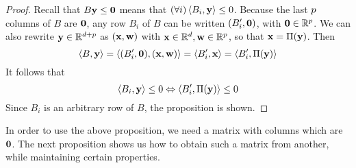 \begin{proof}
	Recall that $B\mathbf{y} \leq \mathbf{0}$ means that $(\forall i)\left\langle B_i, \mathbf{y} \right\rangle \leq 0$.  Because the last $p$ columns of $B$ are $\mathbf{0}$, any row $B_i$ of $B$ can be written $(B'_i,\mathbf{0})$, with $\mathbf{0} \in \mathbb{R}^p$.  We can also rewrite $\mathbf{y}\in\mathbb{R}^{d+p}$ as $(\mathbf{x},\mathbf{w})$ with $\mathbf{x}\in\mathbb{R}^d,\mathbf{w}\in\mathbb{R}^p$, so that $\mathbf{x} = \Pi(\mathbf{y})$.  Then
	\[ \left\langle B, \mathbf{y} \right\rangle = \left\langle (B'_i,\mathbf{0}), (\mathbf{x},\mathbf{w}) \right\rangle = \left\langle B'_i, \mathbf{x} \right\rangle = \left\langle B'_i, \Pi(\mathbf{y}) \right\rangle \]
	It follows that
	\[ \left\langle B_i, \mathbf{y} \right\rangle \leq 0 \Leftrightarrow \left\langle B'_i, \Pi(\mathbf{y}) \right\rangle \leq 0 \]
	Since $B_i$ is an arbitrary row of $B$, the proposition is shown.
\end{proof}

In order to use the above proposition, we need a matrix with columns which are $\mathbf{0}$.  The next proposition shows us how to obtain such a matrix from another, while maintaining certain properties.

